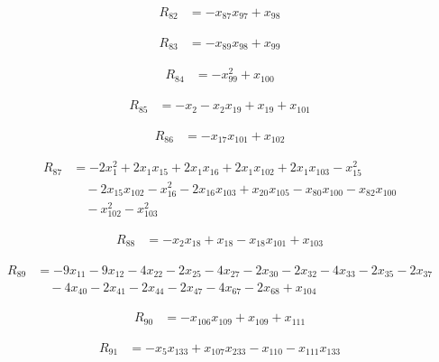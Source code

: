 \begin{align*}
R_{82} &= -x_{87} x_{97} +x_{98}
\end{align*}

\begin{align*}
R_{83} &= -x_{89} x_{98} +x_{99}
\end{align*}

\begin{align*}
R_{84} &= -x_{99}^{2} +x_{100}
\end{align*}

\begin{align*}
R_{85} &= -x_{2} -x_{2} x_{19} +x_{19} +x_{101}
\end{align*}

\begin{align*}
R_{86} &= -x_{17} x_{101} +x_{102}
\end{align*}

\begin{align*}
R_{87} &= -2 x_{1}^{2} +2 x_{1} x_{15} +2 x_{1} x_{16} +2 x_{1} x_{102} +2 x_{1} x_{103} -x_{15}^{2} \\
&\quad -2 x_{15} x_{102} -x_{16}^{2} -2 x_{16} x_{103} +x_{20} x_{105} -x_{80} x_{100} -x_{82} x_{100} \\
&\quad -x_{102}^{2} -x_{103}^{2}
\end{align*}

\begin{align*}
R_{88} &= -x_{2} x_{18} +x_{18} -x_{18} x_{101} +x_{103}
\end{align*}

\begin{align*}
R_{89} &= -9 x_{11} -9 x_{12} -4 x_{22} -2 x_{25} -4 x_{27} -2 x_{30} -2 x_{32} -4 x_{33} -2 x_{35} -2 x_{37} \\
&\quad -4 x_{40} -2 x_{41} -2 x_{44} -2 x_{47} -4 x_{67} -2 x_{68} +x_{104}
\end{align*}

\begin{align*}
R_{90} &= -x_{106} x_{109} +x_{109} +x_{111}
\end{align*}

\begin{align*}
R_{91} &= -x_{5} x_{133} +x_{107} x_{233} -x_{110} -x_{111} x_{133}
\end{align*}


